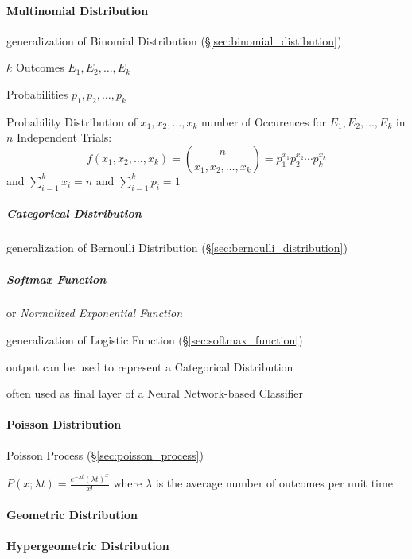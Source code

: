 \paragraph{Multinomial Distribution}\label{sec:multinomial_distribution}\hfill

generalization of Binomial Distribution (\S\ref{sec:binomial_distibution})

$k$ Outcomes $E_1, E_2, \ldots, E_k$

Probabilities $p_1, p_2, \ldots, p_k$

Probability Distribution of $x_1, x_2, \ldots, x_k$ number of
Occurences for $E_1, E_2, \ldots, E_k$ in $n$ Independent Trials:
\[
  f(x_1, x_2, \ldots, x_k) = \binom{n}{x_1, x_2, \ldots, x_k} =
  p_1^{x_1} p_2^{x_2} \cdots p_k^{x_k}
\]
and $\sum_{i=1}^k x_i = n$ and $\sum_{i=1}^k {p_i} = 1$



\subparagraph{Categorical Distribution}\label{sec:categorical_distribution}
\hfill

generalization of Bernoulli Distribution (\S\ref{sec:bernoulli_distribution})



\subparagraph{Softmax Function}\label{sec:softmax}
\hfill

or \emph{Normalized Exponential Function}

generalization of Logistic Function (\S\ref{sec:softmax_function})

output can be used to represent a Categorical Distribution

often used as final layer of a Neural Network-based Classifier



\paragraph{Poisson Distribution}\label{sec:poisson_distribution}\hfill

Poisson Process (\S\ref{sec:poisson_process})

$P(x; \lambda t) = \frac{e^{-\lambda t} (\lambda t)^x}{x!}$
where $\lambda$ is the average number of outcomes per unit time



\paragraph{Geometric Distribution}\label{sec:geometric_distribution}
\hfill

\paragraph{Hypergeometric Distribution}\hfill
\label{sec:hypergeometric_distribution}

